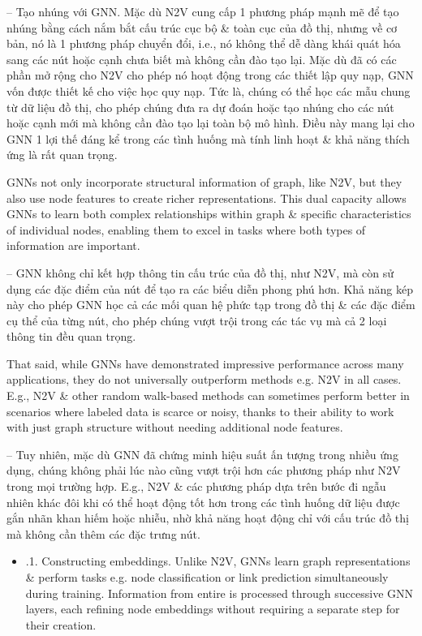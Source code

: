 \documentclass{article}
\begin{document}
\begin{itemize}
\begin{itemize}
       -- {\sf Tạo nhúng với GNN.} Mặc dù N2V cung cấp 1 phương pháp mạnh mẽ để tạo nhúng bằng cách nắm bắt cấu trúc cục bộ \& toàn cục của đồ thị, nhưng về cơ bản, nó là 1 phương pháp chuyển đổi, i.e., nó không thể dễ dàng khái quát hóa sang các nút hoặc cạnh chưa biết mà không cần đào tạo lại. Mặc dù đã có các phần mở rộng cho N2V cho phép nó hoạt động trong các thiết lập quy nạp, GNN vốn được thiết kế cho việc học quy nạp. Tức là, chúng có thể học các mẫu chung từ dữ liệu đồ thị, cho phép chúng đưa ra dự đoán hoặc tạo nhúng cho các nút hoặc cạnh mới mà không cần đào tạo lại toàn bộ mô hình. Điều này mang lại cho GNN 1 lợi thế đáng kể trong các tình huống mà tính linh hoạt \& khả năng thích ứng là rất quan trọng.

       GNNs not only incorporate structural information of graph, like N2V, but they also use node features to create richer representations. This dual capacity allows GNNs to learn both complex relationships within graph \& specific characteristics of individual nodes, enabling them to excel in tasks where both types of information are important.

       -- GNN không chỉ kết hợp thông tin cấu trúc của đồ thị, như N2V, mà còn sử dụng các đặc điểm của nút để tạo ra các biểu diễn phong phú hơn. Khả năng kép này cho phép GNN học cả các mối quan hệ phức tạp trong đồ thị \& các đặc điểm cụ thể của từng nút, cho phép chúng vượt trội trong các tác vụ mà cả 2 loại thông tin đều quan trọng.

       That said, while GNNs have demonstrated impressive performance across many applications, they do not universally outperform methods e.g. N2V in all cases. E.g., N2V \& other random walk-based methods can sometimes perform better in scenarios where labeled data is scarce or noisy, thanks to their ability to work with just graph structure without needing additional node features.

       -- Tuy nhiên, mặc dù GNN đã chứng minh hiệu suất ấn tượng trong nhiều ứng dụng, chúng không phải lúc nào cũng vượt trội hơn các phương pháp như N2V trong mọi trường hợp. E.g., N2V \& các phương pháp dựa trên bước đi ngẫu nhiên khác đôi khi có thể hoạt động tốt hơn trong các tình huống dữ liệu được gắn nhãn khan hiếm hoặc nhiễu, nhờ khả năng hoạt động chỉ với cấu trúc đồ thị mà không cần thêm các đặc trưng nút.
       \begin{itemize}
           \item {.1. Constructing embeddings.} Unlike N2V, GNNs learn graph representations \& perform tasks e.g. node classification or link prediction simultaneously during training. Information from entire is processed through successive GNN layers, each refining node embeddings without requiring a separate step for their creation.


\end{itemize}
\end{itemize}
\end{itemize}
\end{document}
